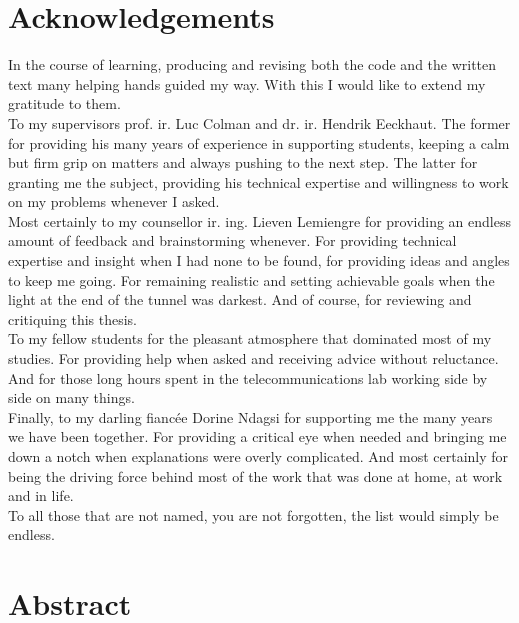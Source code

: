 \documentclass[11pt,british]{article}
\begin{document}
\section*{Acknowledgements}
In the course of learning, producing and revising both the code and the written text many helping hands guided my way. With this I would like to extend my gratitude to them.
\\[\baselineskip]
To my supervisors prof. ir. Luc Colman and dr. ir. Hendrik Eeckhaut. The former for providing his many years of experience in supporting students, keeping a calm but firm grip on matters and always pushing to the next step. The latter for granting me the subject, providing his technical expertise and willingness to work on my problems whenever I asked.
\\[\baselineskip]
Most certainly to my counsellor ir. ing. Lieven Lemiengre for providing an endless amount of feedback and brainstorming whenever. For providing technical expertise and insight when I had none to be found, for providing ideas and angles to keep me going. For remaining realistic and setting achievable goals when the light at the end of the tunnel was darkest. And of course, for reviewing and critiquing this thesis.
\\[\baselineskip]
To my fellow students for the pleasant atmosphere that dominated most of my studies. For providing help when asked and receiving advice without reluctance. And for those long hours spent in the telecommunications lab working side by side on many things.
\\[\baselineskip]
Finally, to my darling fianc\'{e}e Dorine Ndagsi for supporting me the many years we have been together. For providing a critical eye when needed and bringing me down a notch when explanations were overly complicated. And most certainly for being the driving force behind most of the work that was done at home, at work and in life.
\\[\baselineskip]
To all those that are not named, you are not forgotten, the list would simply be endless.

\pagebreak{}


\newpage{}
\section*{Abstract}
\end{document}
